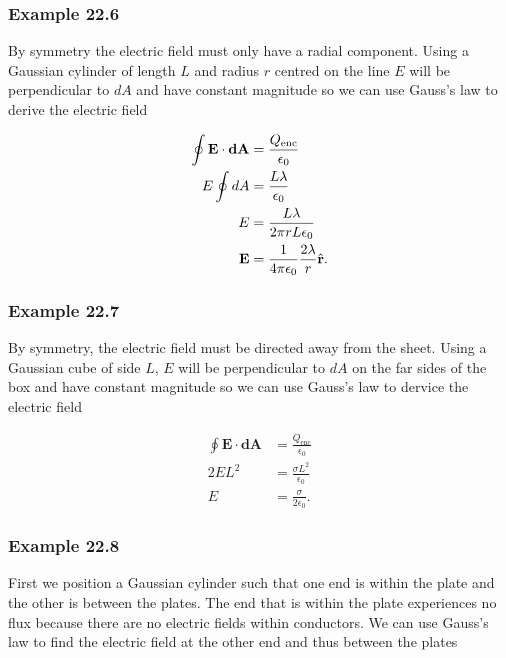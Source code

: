 \documentclass{article}
\begin{document}
\subsubsection{Example 22.6}

By symmetry the electric field must only have a radial component. Using a Gaussian cylinder of length $L$ and radius $r$ centred on the line $E$ will be perpendicular to $dA$ and have constant magnitude so we can use Gauss's law to derive the electric field

\begin{align*}
  \oint \mathbf{E} \cdot \mathbf{dA} & = \frac{Q_\textrm{enc}}{\epsilon_0}         \\
  E \oint dA                         & = \frac{L \lambda}{\epsilon_0}              \\
  E                                  & = \frac{L \lambda}{2 \pi r L \epsilon_0}    \\
  \mathbf{E}                         & = \frac{1}{4 \pi \epsilon_0} \frac{2 \lambda}{r} \hat{\mathbf{r}}.
\end{align*}

\subsubsection{Example 22.7}

By symmetry, the electric field must be directed away from the sheet. Using a Gaussian cube of side $L$, $E$ will be perpendicular to $dA$ on the far sides of the box and have constant magnitude so we can use Gauss's law to dervice the electric field

\begin{align*}
  \oint \mathbf{E} \cdot \mathbf{dA} & = \frac{Q_\textrm{enc}}{\epsilon_0} \\
  2 E L^2                            & = \frac{\sigma L^2}{\epsilon_0}     \\
  E                                  & = \frac{\sigma}{2 \epsilon_0}.
\end{align*}

\subsubsection{Example 22.8}

First we position a Gaussian cylinder such that one end is within the plate and the other is between the plates. The end that is within the plate experiences no flux because there are no electric fields within conductors. We can use Gauss's law to find the electric field at the other end and thus between the plates
\end{document}

